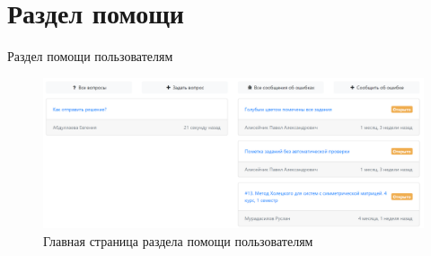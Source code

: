 \documentclass[10pt,pdf,hyperref={unicode}]{beamer}
\begin{document}
\section{Раздел помощи}
\begin{frame}{Раздел помощи пользователям}
    \begin{figure}
        \includegraphics[scale=0.16]{support}
        \caption{Главная страница раздела помощи пользователям}
        \centering
    \end{figure}
\end{frame}
\end{document}
